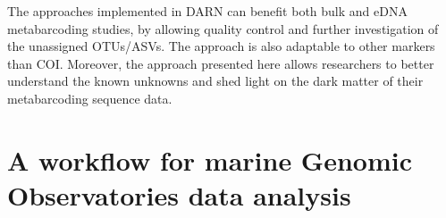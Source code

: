    The approaches implemented in DARN can benefit both bulk and eDNA metabarcoding studies, by allowing quality control and further investigation of the unassigned OTUs/ASVs. 
   The approach is also adaptable to other markers than COI. Moreover, the approach presented here allows researchers to better understand the known unknowns and shed light on the dark matter of their metabarcoding sequence data.


\section{A workflow for marine Genomic Observatories data analysis}



